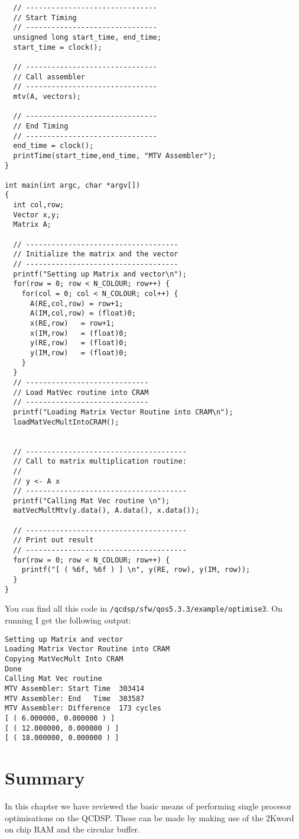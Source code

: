 {\begin{verbatim}
  // -------------------------------
  // Start Timing
  // -------------------------------
  unsigned long start_time, end_time;
  start_time = clock();

  // -------------------------------
  // Call assembler
  // -------------------------------
  mtv(A, vectors);  

  // -------------------------------
  // End Timing
  // -------------------------------
  end_time = clock();
  printTime(start_time,end_time, "MTV Assembler");
}

int main(int argc, char *argv[])
{
  int col,row;
  Vector x,y;
  Matrix A;

  // ------------------------------------
  // Initialize the matrix and the vector
  // ------------------------------------
  printf("Setting up Matrix and vector\n");
  for(row = 0; row < N_COLOUR; row++) {
    for(col = 0; col < N_COLOUR; col++) {
      A(RE,col,row) = row+1;
      A(IM,col,row) = (float)0;
      x(RE,row)   = row+1;
      x(IM,row)   = (float)0;
      y(RE,row)   = (float)0;
      y(IM,row)   = (float)0;
    }
  }
  // -----------------------------
  // Load MatVec routine into CRAM
  // -----------------------------
  printf("Loading Matrix Vector Routine into CRAM\n");
  loadMatVecMultIntoCRAM();


  // --------------------------------------
  // Call to matrix multiplication routine:
  //
  // y <- A x
  // --------------------------------------
  printf("Calling Mat Vec routine \n");
  matVecMultMtv(y.data(), A.data(), x.data());

  // --------------------------------------
  // Print out result
  // --------------------------------------
  for(row = 0; row < N_COLOUR; row++) {
    printf("[ ( %6f, %6f ) ] \n", y(RE, row), y(IM, row));
  }
}
\end{verbatim}}

You can find all this code in {\tt /qcdsp/sfw/qos5.3.3/example/optimise3}.
On running I get the following output:
\begin{verbatim}
Setting up Matrix and vector
Loading Matrix Vector Routine into CRAM
Copying MatVecMult Into CRAM
Done
Calling Mat Vec routine 
MTV Assembler: Start Time  303414
MTV Assembler: End   Time  303587
MTV Assembler: Difference  173 cycles
[ ( 6.000000, 0.000000 ) ] 
[ ( 12.000000, 0.000000 ) ] 
[ ( 18.000000, 0.000000 ) ] 
\end{verbatim}

\section{Summary}
In this chapter we have reviewed the basic means of performing 
single procesor optimisations on the QCDSP. These can be made
by making use of the 2Kword on chip RAM and the circular buffer.

